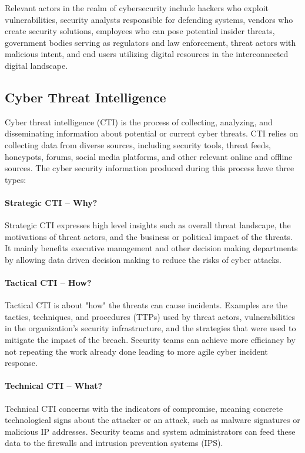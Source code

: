 \documentclass{article}
\begin{document}
Relevant actors in the realm of cybersecurity include hackers who exploit vulnerabilities, security analysts responsible for defending systems, vendors who create security solutions, employees who can pose potential insider threats, government bodies serving as regulators and law enforcement, threat actors with malicious intent, and end users utilizing digital resources in the interconnected digital landscape.

\subsection{Cyber Threat Intelligence}
Cyber threat intelligence (CTI) is the process of collecting, analyzing, and disseminating information about potential or current cyber threats.
CTI relies on collecting data from diverse sources, including security tools, threat feeds, honeypots, forums, social media platforms, and other relevant online and offline sources. The cyber security information produced during this process have three types:

\paragraph{Strategic CTI -- Why?}
Strategic CTI expresses high level insights such as overall threat landscape, the motivations of threat actors, and the business or political impact of the threats. It mainly benefits executive management and other decision making departments by allowing data driven decision making to reduce the risks of cyber attacks.

\paragraph{Tactical CTI -- How?}
Tactical CTI is about "how" the threats can cause incidents. Examples are the tactics, techniques, and procedures (TTPs) used by threat actors, vulnerabilities in the organization's security infrastructure, and the strategies that were used to mitigate the impact of the breach. Security teams can achieve more efficiancy by not repeating the work already done leading to more agile cyber incident response.

\paragraph*{Technical CTI -- What?}
Technical CTI concerns with the indicators of compromise, meaning concrete technological signs about the attacker or an attack, such as malware signatures or malicious IP addresses. Security teams and system administrators can feed these data to the firewalls and intrusion prevention systems (IPS).
\end{document}
